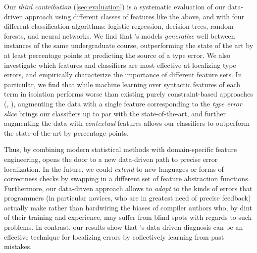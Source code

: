 Our \emph{third contribution} (\autoref{sec:evaluation})
is a systematic evaluation of our data-driven approach
using different classes of features like the above, and
with four different classification algorithms: logistic
regression, decision trees, random forests, and neural networks.
%
We find that \toolname's models \emph{generalize} well
between instances of the same undergraduate course, outperforming
the state of the art by at least \ToolnameWinSherrloc
percentage points at predicting the source of a type error.
%
We also investigate which features and classifiers
are most effective at localizing type errors, and
empirically characterize the importance of different
feature sets.
%
In particular, we find that while machine learning
over syntactic features of each term in isolation
performs worse than existing
purely constraint-based approaches (\eg \ocaml, \sherrloc),
augmenting the data with a single feature corresponding to
the \emph{type error slice} \citep{Tip2001-qp} brings our
classifiers up to par with the state-of-the-art,
and further augmenting the data with \emph{contextual}
features allows our classifiers to outperform
the state-of-the-art by \ToolnameWinSherrloc percentage points.

Thus, by combining modern statistical methods
with domain-specific feature engineering, \toolname
opens the door to a new data-driven path to
precise error localization.
%
In the future, we could \emph{extend}
\toolname to new languages or forms
of correctness checks by swapping in
a different set of feature abstraction
functions.
%
Furthermore, our data-driven approach
allows \toolname to \emph{adapt} to
the kinds of errors that programmers
(in particular novices, who are in greatest
need of precise feedback) actually make
rather than hardwiring the biases of
compiler authors who, by dint of their
training and experience, may suffer from
blind spots with regards to such problems.
%
In contrast, our results show that \toolname's
data-driven diagnosis can be an effective
technique for localizing errors by collectively
learning from past mistakes.

